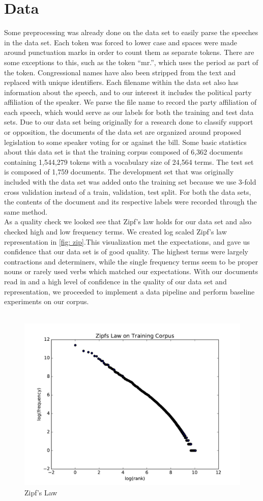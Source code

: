 \documentclass[a4paper, 12pt]{article}
\begin{document}
	
\section{Data}
Some preprocessing was already done on the data set to easily parse the speeches in the data set. Each token was forced to lower case and spaces were made around punctuation marks in order to count them as separate tokens. There are some exceptions to this, such as the token ``mr.'', which uses the period as part of the token. Congressional names have also been stripped from the text and replaced with unique identifiers. Each filename within the data set also has information about the speech, and to our interest it includes the political party affiliation of the speaker. We parse the file name to record the party affiliation of each speech, which would serve as our labels for both the training and test data sets. Due to our data set being originally for a research done to classify support or opposition, the documents of the data set are organized around proposed legislation to some speaker voting for or against the bill. Some basic statistics about this data set is that the training corpus composed of 6,362 documents containing 1,544,279 tokens with a vocabulary size of 24,564 terms. The test set is composed of 1,759 documents. The development set that was originally included with the data set was added onto the training set because we use 3-fold cross validation instead of a train, validation, test split. For both the data sets, the contents of the document and its respective labels were recorded through the same method.\\ 

\noindent
As a quality check we looked see that  Zipf's law holds for our data set and also checked high and low frequency terms. We created log scaled Zipf's law representation in \autoref{fig: zip}.This visualization met the expectations, and gave us confidence that our data set is of good quality. The highest terms were largely contractions and determiners, while the single frequency terms seem to be proper nouns or rarely used verbs which matched our expectations. With our documents read in and a high level of confidence in the quality of our data set and representation, we proceeded to implement a data pipeline and perform baseline experiments on our corpus.\\\
\begin{figure}[!ht]
\centering
\includegraphics[width=0.5\linewidth]{zipfslaw.pdf}
\caption[Zipf's Law]{Zipf's Law}
\label{fig: zip}
\end{figure}
\end{document}
